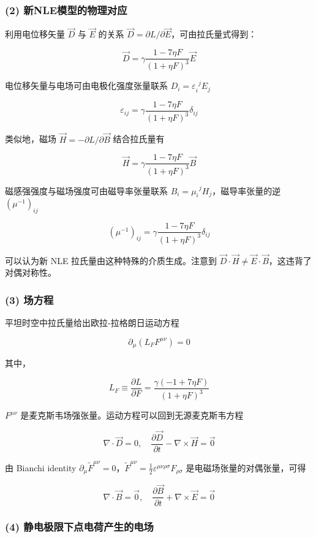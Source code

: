 \documentclass[aps,prl,preprint,groupedaddress,showkeys]{revtex4-2}
\begin{document}
\subsubsection{(2) 新NLE模型的物理对应}

利用电位移矢量 $\vec{D} $ 与 $\vec{E} $ 的关系 $\vec{D}=\partial L/\partial \vec{E} $，可由拉氏量式得到：

$$
\vec{D}
=\gamma\frac{1-7\eta F }{(1+\eta F)^3 } \vec{E}
$$

电位移矢量与电场可由电极化强度张量联系 $D_i = \varepsilon_i^{~~ j } E_j $ 

$$
\varepsilon_{ij} = \gamma \frac{1-7\eta F }{(1+\eta F)^3 }\delta_{ij} 
$$

类似地，磁场 $\vec{H}=-\partial L/\partial \vec{B} $ 结合拉氏量有

$$
\vec{H}
=\gamma \frac{1-7\eta F }{(1+\eta F)^3 } \vec{B}
$$

磁感强强度与磁场强度可由磁导率张量联系 $B_i=\mu_i^{~~j}H_j $，磁导率张量的逆 $\left(\mu^{-1} \right)_{ij} $

$$
\left(\mu^{-1} \right)_{ij}
=\gamma \frac{1-7\eta F }{(1+\eta F)^3 } \delta_{ij}
$$

可以认为新 NLE 拉氏量由这种特殊的介质生成。注意到 $\vec{D}\cdot\vec{H}\ne \vec{E}\cdot\vec{B}$，这违背了对偶对称性。

\subsubsection{(3) 场方程}

平坦时空中拉氏量给出欧拉-拉格朗日运动方程

$$
\partial_\mu\left(L_F F^{\mu\nu} \right) = 0
$$

其中，

$$
L_F
\equiv \frac{\partial L }{\partial F } 
=\frac{\gamma(-1+7\eta F) }{(1+\eta F)^3 }
$$
    
$F^{\mu \nu} $ 是麦克斯韦场强张量。运动方程可以回到无源麦克斯韦方程

$$
\nabla\cdot\vec{D} = 0,\quad
\frac{\partial \vec{D} }{\partial t } - \nabla\times\vec{H}= \vec{0} 
$$
    
由 Bianchi identity $\partial_\mu \tilde{F}^{\mu \nu}=0 $，$\tilde{F}^{\mu\nu}=\frac{1 }{2 } \varepsilon^{\mu\nu\rho\sigma}F_{\rho\sigma} $ 是电磁场张量的对偶张量，可得
    
$$
\nabla\cdot\vec{B} = \vec{0},\quad 
\frac{\partial \vec{B} }{\partial t } + \nabla\times\vec{E} = \vec{0} 
$$

\subsubsection{(4) 静电极限下点电荷产生的电场}
\end{document}
